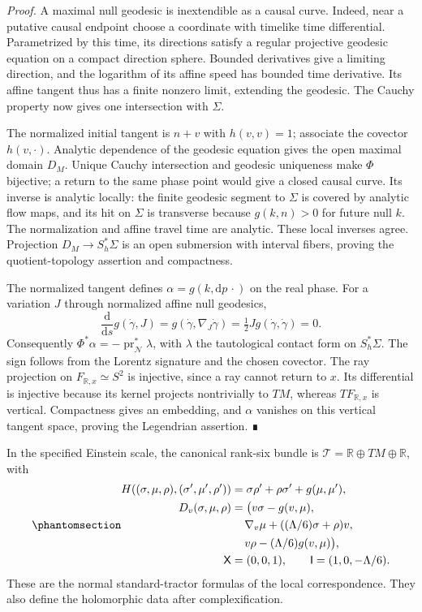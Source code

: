 \documentclass[
  english,
  11pt,
  reqno]{amsart}
\begin{document}
\emph{Proof.} A maximal null geodesic is inextendible as a causal curve.
Indeed, near a putative causal endpoint choose a coordinate with
timelike time differential. Parametrized by this time, its directions
satisfy a regular projective geodesic equation on a compact direction
sphere. Bounded derivatives give a limiting direction, and the logarithm
of its affine speed has bounded time derivative. Its affine tangent thus
has a finite nonzero limit, extending the geodesic. The Cauchy property
now gives one intersection with \(\Sigma\).

The normalized initial tangent is \(n+v\) with \(h(v,v)=1\); associate
the covector \(h(v,\cdot)\). Analytic dependence of the geodesic
equation gives the open maximal domain \(D_M\). Unique Cauchy
intersection and geodesic uniqueness make \(\Phi\) bijective; a return
to the same phase point would give a closed causal curve. Its inverse is
analytic locally: the finite geodesic segment to \(\Sigma\) is covered
by analytic flow maps, and its hit on \(\Sigma\) is transverse because
\(g(k,n)>0\) for future null \(k\). The normalization and affine travel
time are analytic. These local inverses agree. Projection
\(D_M\to S_h^*\Sigma\) is an open submersion with interval fibers,
proving the quotient-topology assertion and compactness.

The normalized tangent defines \(\alpha=g(k,\mathrm d p\,\cdot)\) on the
real phase. For a variation \(J\) through normalized affine null
geodesics, \[
\frac{\mathrm d}{\mathrm ds}g(\dot\gamma,J)
=g(\dot\gamma,\nabla_J\dot\gamma)
=\tfrac12Jg(\dot\gamma,\dot\gamma)=0.
\] Consequently
\(\Phi^*\alpha=-\operatorname{pr}_{\mathcal N}^*\lambda\), with
\(\lambda\) the tautological contact form on \(S_h^*\Sigma\). The sign
follows from the Lorentz signature and the chosen covector. The ray
projection on \(F_{\mathbb R,x}\simeq S^2\) is injective, since a ray
cannot return to \(x\). Its differential is injective because its kernel
projects nontrivially to \(TM\), whereas \(TF_{\mathbb R,x}\) is
vertical. Compactness gives an embedding, and \(\alpha\) vanishes on
this vertical tangent space, proving the Legendrian assertion. ∎

In the specified Einstein scale, the canonical rank-six bundle is
\(\mathcal T=\mathbb R\oplus TM\oplus\mathbb R\), with
\begin{equation}\protect\phantomsection\label{eq:real-ray-canonical-tractor}{\begin{aligned}
H((\sigma,\mu,\rho),(\sigma',\mu',\rho'))
 &=\sigma\rho'+\rho\sigma'+g(\mu,\mu'), \\
D_v(\sigma,\mu,\rho)
 &=\bigl(v\sigma-g(v,\mu),\\
 &\quad \,
       \nabla_v\mu+((\Lambda/6)\sigma+\rho)v,\\
 &\quad \,
       v\rho-(\Lambda/6)g(v,\mu)\bigr), \\
\mathsf X&=(0,0,1),\qquad
\mathsf I=(1,0,-\Lambda/6).
\end{aligned}}\end{equation} These are the normal standard-tractor formulas of the
local correspondence. They also define the holomorphic data after
complexification.
\end{document}
